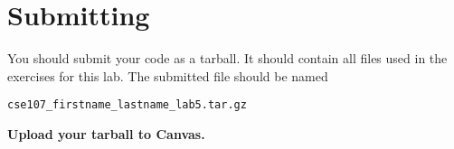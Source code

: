 \documentclass[11pt]{cselabheader}
\begin{document}
\section{Submitting}

You should submit your code as a tarball. It should contain all files
used in the exercises for this lab. The submitted file should be named
\begin{center}
  \texttt{cse107\_firstname\_lastname\_lab5.tar.gz}
\end{center}

\begin{center}
  \textbf{Upload your tarball to Canvas.}
\end{center}

\listoftheorems
\end{document}
